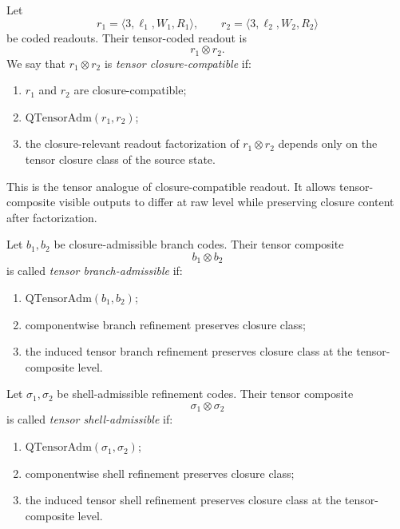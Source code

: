 \begin{definition}
Let
\[
r_1=\langle 3,\ell_1,W_1,R_1\rangle,
\qquad
r_2=\langle 3,\ell_2,W_2,R_2\rangle
\]
be coded readouts. Their tensor-coded readout is
\[
r_1\otimes r_2.
\]
We say that $r_1\otimes r_2$ is \emph{tensor closure-compatible} if:
\begin{enumerate}
\item $r_1$ and $r_2$ are closure-compatible;
\item $\mathrm{QTensorAdm}(r_1,r_2)$;
\item the closure-relevant readout factorization of $r_1\otimes r_2$ depends only on the tensor closure class of the source state.
\end{enumerate}
\end{definition}

\begin{remark}
This is the tensor analogue of closure-compatible readout. It allows tensor-composite visible outputs to differ at raw level while preserving closure content after factorization.
\end{remark}

\begin{definition}
Let $b_1,b_2$ be closure-admissible branch codes. Their tensor composite
\[
b_1\otimes b_2
\]
is called \emph{tensor branch-admissible} if:
\begin{enumerate}
\item $\mathrm{QTensorAdm}(b_1,b_2)$;
\item componentwise branch refinement preserves closure class;
\item the induced tensor branch refinement preserves closure class at the tensor-composite level.
\end{enumerate}
\end{definition}

\begin{definition}
Let $\sigma_1,\sigma_2$ be shell-admissible refinement codes. Their tensor composite
\[
\sigma_1\otimes \sigma_2
\]
is called \emph{tensor shell-admissible} if:
\begin{enumerate}
\item $\mathrm{QTensorAdm}(\sigma_1,\sigma_2)$;
\item componentwise shell refinement preserves closure class;
\item the induced tensor shell refinement preserves closure class at the tensor-composite level.
\end{enumerate}
\end{definition}

